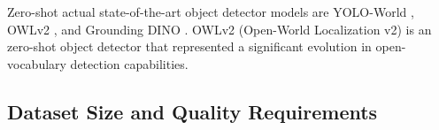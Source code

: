 \documentclass[12pt,a4paper,oneside]{report}
\begin{document}
Zero-shot actual state-of-the-art object detector models are YOLO-World \cite{kangFewshotObjectDetection2019} , 
OWLv2 \cite{mindererScalingOpenVocabularyObject2023} , and Grounding DINO \cite{liuGroundingDINOMarrying2025}.
OWLv2 (Open-World Localization v2) is an zero-shot object detector that represented a significant 
evolution in open-vocabulary detection capabilities. 

\subsection{Dataset Size and Quality Requirements}
\end{document}
